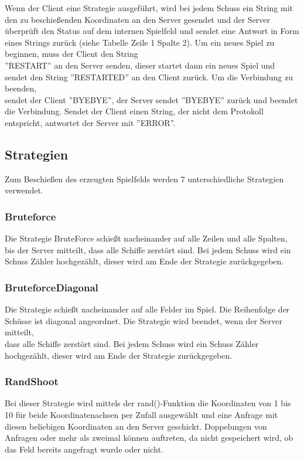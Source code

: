 Wenn der Client eine Strategie ausgeführt, wird bei jedem Schuss ein String mit den zu beschießenden Koordinaten an den Server gesendet und der Server überprüft den Status auf dem internen Spielfeld und sendet eine Antwort in Form eines Strings zurück (siehe Tabelle Zeile 1 Spalte 2).
Um ein neues Spiel zu beginnen, muss der Client den String \\''RESTART'' an den Server senden, dieser startet dann ein neues Spiel und sendet den String ''RESTARTED'' an den Client zurück. Um die Verbindung zu beenden, \\sendet der Client ''BYEBYE'', der Server sendet ''BYEBYE'' zurück und beendet die Verbindung.
Sendet der Client einen String, der nicht dem Protokoll entspricht, antwortet der Server mit ''ERROR''. 

\subsection{Strategien}
Zum Beschießen des erzeugten Spielfelds werden 7 unterschiedliche Strategien verwendet.

\subsubsection{Bruteforce}

Die Strategie BruteForce schießt nacheinander auf alle Zeilen und alle Spalten, \\bis der Server mitteilt, dass alle Schiffe zerstört sind. Bei jedem Schuss wird ein Schuss Zähler hochgezählt, dieser wird am Ende der Strategie zurückgegeben.

\subsubsection{BruteforceDiagonal}

Die Strategie schießt nacheinander auf alle Felder im Spiel. Die Reihenfolge der Schüsse ist diagonal angeordnet. Die Strategie wird beendet, wenn der Server mitteilt, \\dass alle Schiffe zerstört sind. Bei jedem Schuss wird ein Schuss Zähler hochgezählt, dieser wird am Ende der Strategie zurückgegeben.
\newpage

\subsubsection{RandShoot}

Bei dieser Strategie wird mittels der rand()-Funktion die Koordinaten von 1 bis 10 für
beide Koordinatenachsen per Zufall ausgewählt und eine Anfrage mit diesen beliebigen Koordinaten an den
Server geschickt. Doppelungen von Anfragen oder mehr als zweimal können auftreten,
da nicht gespeichert wird, ob das Feld bereits angefragt wurde oder nicht.


